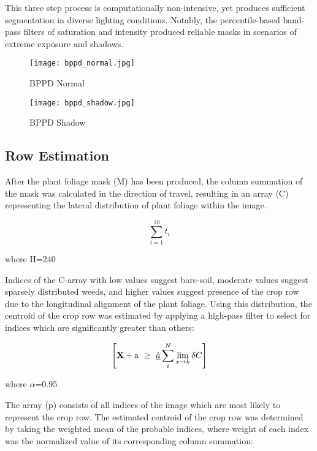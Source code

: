This three step process is computationally non-intensive, yet produces
sufficient segmentation in diverse lighting conditions. Notably, the
percentile-based band-pass filters of saturation and intensity
produced reliable masks in scenarios of extreme exposure and shadows.

\begin{figure}
  \centering
  \texttt{[image: bppd\_normal.jpg]}
  \caption{BPPD Normal}
  \label{fig:bppd_normal}
\end{figure}

\begin{figure}
  \centering
  \texttt{[image: bppd\_shadow.jpg]}
  \caption{BPPD Shadow}
  \label{fig:bppd_shadow}
\end{figure}

\subsection{Row Estimation}
After the plant foliage mask (M) has been produced, the column
summation of the mask was calculated in the direction of travel,
resulting in an array (C) representing the lateral distribution of
plant foliage within the image. 

\begin{equation}
  \displaystyle\sum_{i=1}^{10} t_i
  \label{eq:col_sum}
\end{equation}
\begin{flushleft}
where H=240
\end{flushleft}

Indices of the C-array with low values suggest bare-soil, moderate
values suggest sparsely distributed weeds, and higher values suggest
presence of the crop row due to the longitudinal alignment of the
plant foliage. Using this distribution, the centroid of the crop row
was estimated by applying a high-pass filter to select for indices
which are significantly greater than others: 

\begin{equation}
  \left[
    {\bf X} + {\rm a} \ \geq\ 
    \underline{\hat a} \sum_i^N \lim_{x \rightarrow k} \delta C
  \right]
  \label{eq:p_threshold}
\end{equation}
\begin{flushleft}
where $\alpha$=0.95
\end{flushleft}

The array (p) consists of all indices of the image which are most
likely to represent the crop row. The estimated centroid of the crop
row was determined by taking the weighted mean of the probable
indices, where weight of each index was the normalized value of its
corresponding column summation:


